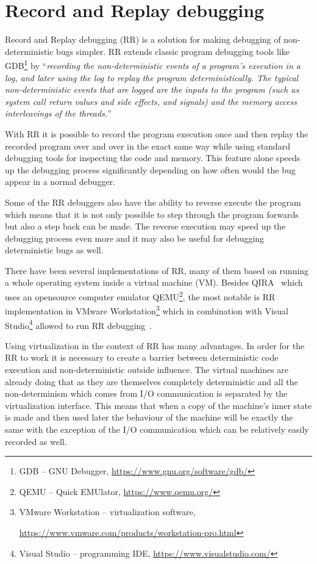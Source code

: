 \documentclass[thesis=M,english,hidelinks]{FITthesis}[2012/10/20]
\newcommand*{\qt}[1]{\enquote{{\itshape#1}}}
\begin{document}
\chapter{Record and Replay debugging}
Record and Replay debugging (RR) is a solution for making debugging of non-deterministic bugs simpler. RR extends classic program debugging tools like GDB\footnote{GDB -- GNU Debugger, \url{https://www.gnu.org/software/gdb/}} by \qt{recording the non-deterministic events of a program’s execution in a log, and later using the log to replay the program deterministically. The typical non-deterministic events that are logged are the inputs to the program (such as system call return values and side effects, and signals) and the memory access interleavings of the threads.}~\cite{RnR}\par

With RR it is possible to record the program execution once and then replay the recorded program over and over in the exact same way while using standard debugging tools for inspecting the code and memory. This feature alone speeds up the debugging process significantly depending on how often would the bug appear in a normal debugger.\par

Some of the RR debuggers also have the ability to reverse execute the program which means that it is not only possible to step through the program forwards but also a step back can be made. The reverse execution may speed up the debugging process even more and it may also be useful for debugging deterministic bugs as well.\par

There have been several implementations of RR, many of them based on running a whole operating system inside a virtual machine (VM). Besides QIRA~\cite{qira} which uses an opensource computer emulator QEMU\footnote{QEMU -- Quick EMUlator, \url{https://www.qemu.org/}}, the most notable is RR implementation in VMware Workstation\footnote{VMware Workstation -- virtualization software,\par\url{https://www.vmware.com/products/workstation-pro.html}} which in combination with Visual Studio\footnote{Visual Studio -- programming IDE, \url{https://www.visualstudio.com/}} allowed to run RR debugging~\cite{vmware}.\par

Using virtualization in the context of RR has many advantages. In order for the RR to work it is necessary to create a barrier between deterministic code execution and non-deterministic outside influence. The virtual machines are already doing that as they are themselves completely deterministic and all the non-determinism which comes from I/O communication is separated by the virtualization interface. This means that when a copy of the machine's inner state is made and then used later the behaviour of the machine will be exactly the same with the exception of the I/O communication which can be relatively easily recorded as well.\par
\end{document}
